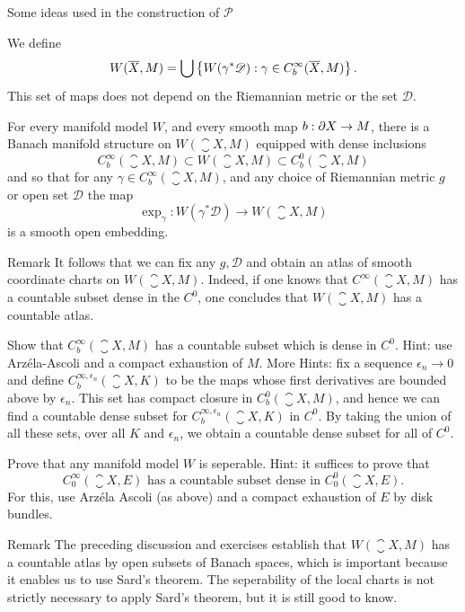 \documentclass{amsart}
\begin{document}
\begin{clear}{Some ideas used in the construction of $\mathscr{P}$}
\begin{defn}
  We define
  \begin{equation*}
    W(\overline{X},M)=\bigcup \left\{W(\gamma^{*}\mathscr{D}):\gamma\in C^{\infty}_{b}(\overline{X},M)\right\}.
  \end{equation*}
  This set of maps does not depend on the Riemannian metric or the set $\mathscr{D}$.
\end{defn}
\begin{thm}
  For every manifold model $W$, and every smooth map $b:\partial X\to M$, there is a Banach manifold structure on $W(\closure{X},M)$ equipped with dense inclusions
  \begin{equation*}
    C^{\infty}_{b}(\closure{X},M)\subset W(\closure{X},M)\subset C^{0}_{b}(\closure{X},M)
  \end{equation*}
  and so that for any $\gamma\in C^{\infty}_{b}(\closure{X},M)$, and any choice of Riemannian metric $g$ or open set $\mathscr{D}$ the map
  \begin{equation*}
    \exp_{\gamma}:W(\gamma^{*}\mathscr{D})\to W(\closure{X},M)
  \end{equation*}
  is a smooth open embedding. 
\end{thm}
\begin{clear}{Remark}
  It follows that we can fix any $g,\mathscr{D}$ and obtain an atlas of smooth coordinate charts on $W(\closure{X},M)$. Indeed, if one knows that $C^{\infty}(\closure{X},M)$ has a countable subset dense in the $C^{0}$, one concludes that $W(\closure{X},M)$ has a countable atlas. 
\end{clear}
\begin{xca}
  Show that $C^{\infty}_{b}(\closure{X},M)$ has a countable subset which is dense in $C^{0}$. Hint: use Arz\'ela-Ascoli and a compact exhaustion of $M$. More Hints: fix a sequence $\epsilon_{n}\to 0$ and define $C^{\infty,\epsilon_{n}}_{b}(\closure{X},K)$ to be the maps whose first derivatives are bounded above by $\epsilon_{n}$. This set has compact closure in $C^{0}_{b}(\closure{X},M)$, and hence we can find a countable dense subset for $C^{\infty,\epsilon_{n}}_{b}(\closure{X},K)$ in $C^{0}$. By taking the union of all these sets, over all $K$ and $\epsilon_{n}$, we obtain a countable dense subset for all of $C^{0}$.
\end{xca}
\begin{xca}
  Prove that any manifold model $W$ is seperable. Hint: it suffices to prove that
  \begin{equation*}
    C^{\infty}_{0}(\closure{X},E)\text{ has a countable subset dense in }C^{0}_{0}(\closure{X},E).
  \end{equation*}
  For this, use Arz\'ela Ascoli (as above) and a compact exhaustion of $E$ by disk bundles.
\end{xca}
\begin{clear}{Remark}
  The preceding discussion and exercises establish that
  $W(\closure{X},M)$ has a countable atlas by open subsets of Banach
  spaces, which is important because it enables us to use Sard's
  theorem. The seperability of the local charts is not strictly
  necessary to apply Sard's theorem, but it is still good to know.
\end{clear}
\end{clear}
\end{document}

